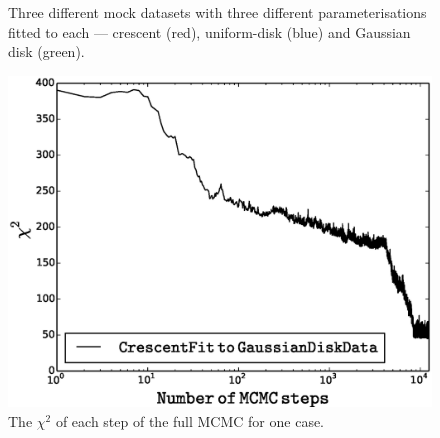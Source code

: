 \begin{figure}
\caption{\label{fig:datafitting} Three different mock datasets with
  three different parameterisations fitted to each --- crescent (red),
  uniform-disk (blue) and Gaussian disk (green).}
\end{figure}


\begin{figure}
\centering
\includegraphics[width=0.9\hsize]{plots/burnin_cg.eps}
\caption{\label{fig:datafitting} The $\chi^2$ of each step of the full
  MCMC for one case.}
\end{figure}




